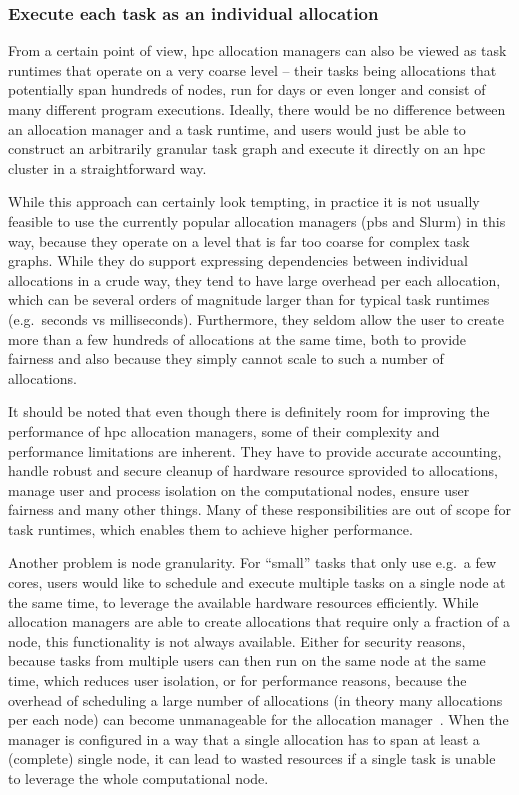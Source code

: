 \subsubsection*{Execute each task as an individual allocation}
From a certain point of view, \gls{hpc} allocation managers can also be viewed as
task runtimes that operate on a very coarse level -- their tasks being allocations that potentially
span hundreds of nodes, run for days or even longer and consist of many different program
executions. Ideally, there would be no difference between an allocation manager and a task runtime,
and users would just be able to construct an arbitrarily granular task graph and execute it
directly on an \gls{hpc} cluster in a straightforward way.

While this approach can certainly look tempting, in practice it is not usually feasible to use the
currently popular allocation managers (\gls{pbs} and Slurm) in this way, because
they operate on a level that is far too coarse for complex task graphs. While they do support
expressing dependencies between individual allocations in a crude way, they tend to have large
overhead per each allocation, which can be several orders of magnitude
larger than for typical task runtimes (e.g.\ seconds vs milliseconds). Furthermore, they seldom
allow the user to create more than a few hundreds of allocations at the same time, both to provide
fairness and also because they simply cannot scale to such a number of allocations.

It should be noted that even though there is definitely room for improving the performance of
\gls{hpc} allocation managers, some of their complexity and performance
limitations are inherent. They have to provide accurate accounting, handle robust and secure
cleanup of hardware resource sprovided to allocations, manage user and process isolation on the
computational nodes, ensure user fairness and many other things. Many of these responsibilities are
out of scope for task runtimes, which enables them to achieve higher performance.

Another problem is node granularity. For ``small'' tasks that only use e.g.\ a few cores, users
would like to schedule and execute multiple tasks on a single node at the same time, to leverage
the available hardware resources efficiently. While allocation managers are able to create
allocations that require only a fraction of a node, this functionality is not always available.
Either for security reasons, because tasks from multiple users can then run on the same node at the
same time, which reduces user isolation, or for performance reasons, because the overhead of
scheduling a large number of allocations (in theory many allocations per each node) can become
unmanageable for the allocation manager~\cite{it4i_node_scheduling_policy}. When the manager is configured
in a way that a single allocation has to span at least a (complete) single node, it can lead to
wasted resources if a single task is unable to leverage the whole computational node.

